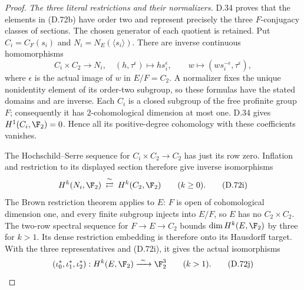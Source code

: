 \begin{proof}
\emph{The three literal restrictions and their normalizers.}
D.34 proves that the elements in (D.72b) have order two
and represent precisely the three $F$-conjugacy classes
of sections. The chosen generator of each quotient is
retained. Put $C_i=C_F(s_i)$ and $N_i=N_E(\langle s_i\rangle)$.
There are inverse continuous homomorphisms
\[
 C_i\times C_2\longrightarrow N_i,
       \quad(h,\tau^\epsilon)\longmapsto hs_i^\epsilon,
 \qquad
 w\longmapsto(ws_i^{-\epsilon},\tau^\epsilon),
                                                               \tag{D.72h}
\]
where $\epsilon$ is the actual image of $w$ in $E/F=C_2$.
A normalizer fixes the unique nonidentity element of its
order-two subgroup, so these formulas have the stated
domains and are inverse. Each $C_i$ is a closed subgroup
of the free profinite group $F$; consequently it has
$2$-cohomological dimension at most one. D.34 gives
$H^1(C_i,\F_2)=0$. Hence all its positive-degree
cohomology with these coefficients vanishes.

The Hochschild--Serre sequence for
$C_i\times C_2\to C_2$ has just its row zero. Inflation
and restriction to its displayed section therefore give
inverse isomorphisms
\[
           H^k(N_i,\F_2)\ \mathop{\rightleftarrows}^\sim\
                         H^k(C_2,\F_2)\qquad(k\geq0).
                                                               \tag{D.72i}
\]
The Brown restriction theorem
\cite[Theorem~2 and the finite-dimensional argument in
\S1.1]{A-KochloukovaZalesskii2007} applies to $E$:
$F$ is open of cohomological dimension one, and every
finite subgroup injects into $E/F$, so $E$ has no
$C_2\times C_2$. The two-row spectral sequence for
$F\to E\to C_2$ bounds $\dim H^k(E,\F_2)$ by three
for $k>1$. Its dense restriction embedding is therefore
onto its Hausdorff target. With the three representatives
and (D.72i), it gives the actual isomorphisms
\[
 (\iota_0^*,\iota_1^*,\iota_2^*):H^k(E,\F_2)
                   \xrightarrow{\ \sim\ }\F_2^3
                                      \qquad(k>1).
                                                               \tag{D.72j}
\]


\end{proof}
